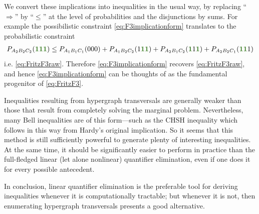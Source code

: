 We convert these implications into inequalities in the usual way, by replacing ``$\Rightarrow$'' by ``$\leq$'' at the level of probabilities and the disjunctions by sums. For example the possibilistic constraint \cref{eq:F3implicationform} translates to the probabilistic constraint
\begin{align}\label{eq:F3rawprobform}
    P_{A_2 B_2 C_2}\parens{\mgreen{1} \mgreen{1} \mgreen{1}} \leq P_{A_1 B_1 C_1}\parens{0 0 0}+P_{A_1 B_2 C_2}\parens{1 \mgreen{1 1}}+P_{A_2 B_1 C_2}\parens{\mgreen{1} 1 \mgreen{1}}+P_{A_2 B_2 C_1}\parens{\mgreen{1 1} 1}
\end{align}
i.e. \cref{eq:FritzF3raw}. Therefore \cref{eq:F3implicationform} recovers \cref{eq:FritzF3raw}, and hence \cref{eq:F3implicationform} can be thoughts of as the fundamental progenitor of \cref{eq:FritzF3}.

Inequalities resulting from hypergraph transversals are generally weaker than those that result from completely solving the marginal problem. Nevertheless, many Bell inequalities are of this form---such as the CHSH inequality which follows in this way from Hardy's original implication. So it seems that this method is still sufficiently powerful to generate plenty of interesting inequalities. At the same time, it should be significantly easier to perform in practice than the full-fledged linear (let alone nonlinear) quantifier elimination, even if one does it for every possible antecedent.

In conclusion, linear quantifier elimination is the preferable tool for deriving inequalities whenever it is computationally tractable; but whenever it is not, then enumerating hypergraph transversals presents a good alternative. %


